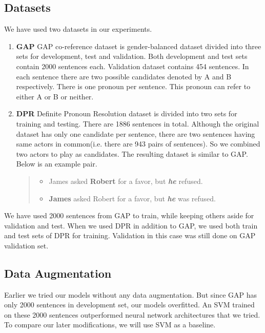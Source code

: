 \documentclass[11pt,a4paper]{article}
\begin{document}
\subsection{Datasets}
\label{subsec:datasets}
We have used two datasets in our experiments.
\begin{enumerate}
\item \textbf{GAP} GAP co-reference dataset \cite{webster2018gap} is gender-balanced dataset divided into three sets for development, test and validation. Both development and test sets contain 2000 sentences each. Validation dataset contains 454 sentences. In each sentence there are two possible candidates denoted by A and B respectively. There is one pronoun per sentence. This pronoun can refer to either A or B or neither. 


\item \textbf{DPR} Definite Pronoun Resolution \cite{rahman2012resolving} dataset is divided into two sets for training and testing. There are 1886 sentences in total. Although the original dataset has only one candidate per sentence, there are two sentences having same actors in common(i.e. there are 943 pairs of sentences). So we combined two actors to play as candidates. The resulting dataset is similar to GAP. Below is an example pair.
  \begin{quote}
    \begin{itemize}
    \item James asked \textbf{Robert} for a favor, but \textit{\textbf{he}} refused.
    \item \textbf{James} asked Robert for a favor, but \textit{\textbf{he}} was refused.
    \end{itemize}
  \end{quote}
\end{enumerate}

We have used 2000 sentences from GAP to train, while keeping others aside for validation and test. When we used DPR in addition to GAP, we used both train and test sets of DPR for training. Validation in this case was still done on GAP validation set.

\subsection{Data Augmentation}
\label{subsec:augment}

Earlier we tried our models without any data augmentation. But since GAP has only 2000 sentences in development set, our models overfitted. An SVM trained on these 2000 sentences outperformed neural network architectures that we tried. To compare our later modifications, we will use SVM as a baseline.
\end{document}
